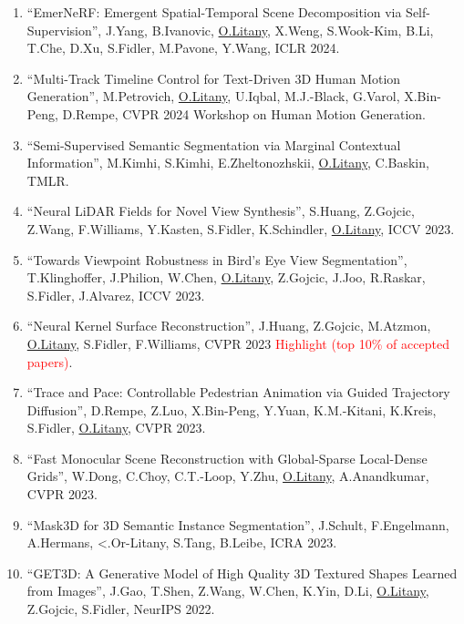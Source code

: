 \begin{enumerate}
\item ``EmerNeRF: Emergent Spatial-Temporal Scene Decomposition via Self-Supervision'', J.Yang, B.Ivanovic, \underline{O.Litany}, X.Weng, S.Wook-Kim, B.Li, T.Che, D.Xu, S.Fidler, M.Pavone, Y.Wang, ICLR 2024.

\item ``Multi-Track Timeline Control for Text-Driven 3D Human Motion Generation'', M.Petrovich, \underline{O.Litany}, U.Iqbal, M.J.-Black, G.Varol, X.Bin-Peng, D.Rempe, CVPR 2024 Workshop on Human Motion Generation.

\item ``Semi-Supervised Semantic Segmentation via Marginal Contextual Information'', M.Kimhi, S.Kimhi, E.Zheltonozhskii, \underline{O.Litany}, C.Baskin, TMLR.

\item ``Neural LiDAR Fields for Novel View Synthesis'', S.Huang, Z.Gojcic, Z.Wang, F.Williams, Y.Kasten, S.Fidler, K.Schindler, \underline{O.Litany}, ICCV 2023.

\item ``Towards Viewpoint Robustness in Bird’s Eye View Segmentation'', T.Klinghoffer, J.Philion, W.Chen, \underline{O.Litany}, Z.Gojcic, J.Joo, R.Raskar, S.Fidler, J.Alvarez, ICCV 2023.

\item ``Neural Kernel Surface Reconstruction'', J.Huang, Z.Gojcic, M.Atzmon, \underline{O.Litany}, S.Fidler, F.Williams, CVPR 2023 \textcolor{red}{Highlight (top 10\% of accepted papers)}.

\item ``Trace and Pace: Controllable Pedestrian Animation via Guided Trajectory Diffusion'', D.Rempe, Z.Luo, X.Bin-Peng, Y.Yuan, K.M.-Kitani, K.Kreis, S.Fidler, \underline{O.Litany}, CVPR 2023.

\item ``Fast Monocular Scene Reconstruction with Global-Sparse Local-Dense Grids'', W.Dong, C.Choy, C.T.-Loop, Y.Zhu, \underline{O.Litany}, A.Anandkumar, CVPR 2023.

\item ``Mask3D for 3D Semantic Instance Segmentation'', J.Schult, F.Engelmann, A.Hermans, <.Or-Litany, S.Tang, B.Leibe, ICRA 2023.

\item ``GET3D: A Generative Model of High Quality 3D Textured Shapes Learned from Images'', J.Gao, T.Shen, Z.Wang, W.Chen, K.Yin, D.Li, \underline{O.Litany}, Z.Gojcic, S.Fidler, NeurIPS 2022.


\end{enumerate}
